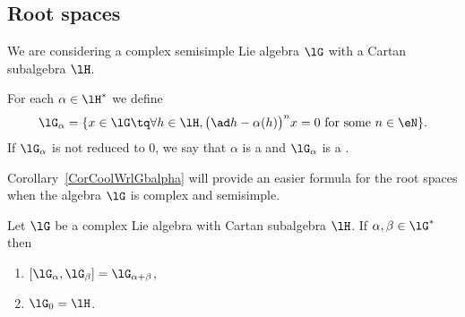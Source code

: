 \subsection{Root spaces}

We are considering a complex semisimple Lie algebra \( \lG\) with a Cartan subalgebra \( \lH\).

\begin{definition}      \label{DefRootSpace}
	For each \( \alpha\in\lH^*\) we define
	\begin{equation}            \label{eq:lG_alpha_nss}
		\lG_{\alpha}=\{  x\in\lG\tq\forall h\in\lH, \big(\ad h-\alpha(h)\big)^nx=0\text{ for some }n\in\eN    \}.
	\end{equation}
	If \( \lG_{\alpha}\) is not reduced to \( 0\), we say that \( \alpha\) is a  and \( \lG_{\alpha}\) is a .
\end{definition}
Corollary~\ref{CorCoolWrlGbalpha} will provide an easier formula for the root spaces when the algebra \( \lG\) is complex and semisimple.
\begin{theorem}     \label{TholGCartalphaplusbeta}
	Let $\lG$ be a complex Lie algebra with Cartan subalgebra $\lH$. If $\alpha,\beta\in\lG^*$ then
	\begin{enumerate}
		\item   \label{ItemTholGCartalphaplusbetai}
		      $[\lG_{\alpha},\lG_{\beta}]=\lG_{\alpha+\beta}$,
		\item $\lG_0=\lH$.
	\end{enumerate}
	\label{prop:deux_racine}
\end{theorem}

